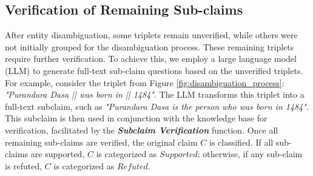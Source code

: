 \documentclass[11pt]{article}
\begin{document}
\subsection{Verification of Remaining Sub-claims}
After entity disambiguation, some triplets remain unverified, while others were not initially grouped for the disambiguation process. These remaining triplets require further verification. To achieve this, we employ a large language model (LLM) to generate full-text sub-claim questions based on the unverified triplets. For example, consider the triplet from Figure \ref{fig:disambiguation_process}: \textit{"Purandara Dasa || was born in || 1484"}. The LLM transforms this triplet into a full-text subclaim, such as \textit{"Purandara Dasa is the person who was born in 1484"}. This subclaim is then used in conjunction with the knowledge base for verification, facilitated by the \textbf{\textit{Subclaim Verification}} function. Once all remaining sub-claims are verified, the original claim $C$ is classified. If all sub-claims are supported, $C$ is categorized as $Supported$; otherwise, if any sub-claim is refuted, $C$ is categorized as $Refuted$.
\end{document}
